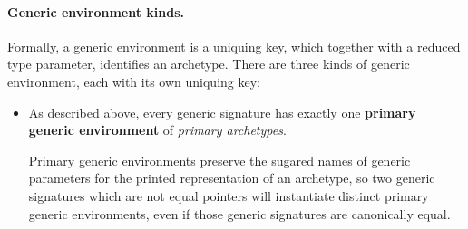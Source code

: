 \documentclass[../generics]{subfiles}
\begin{document}
\paragraph{Generic environment kinds.}
%
%
%
%
%
%
%
Formally, a generic environment is a uniquing key, which together with a reduced type parameter, identifies an archetype. There are three kinds of generic environment, each with its own uniquing key:
\begin{itemize}
\item As described above, every generic signature has exactly one \textbf{primary generic environment} of \emph{primary archetypes}.
\begin{quote}
\end{quote}
Primary generic environments preserve the sugared names of generic parameters for the printed representation of an archetype, so two generic signatures which are not equal pointers will instantiate distinct primary generic environments, even if those generic signatures are canonically equal.


\end{itemize}
\end{document}
